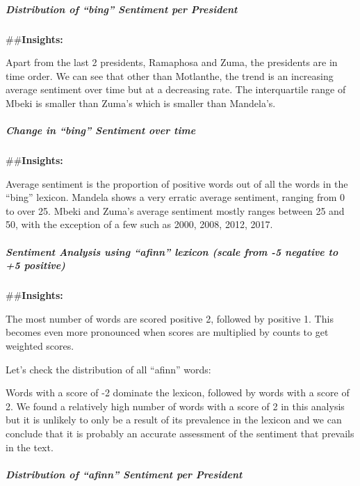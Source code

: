 \documentclass[]{article}
\let\oldsubparagraph\subparagraph
\renewcommand{\subparagraph}[1]{\oldsubparagraph{#1}\mbox{}}
\begin{document}
\hypertarget{distribution-of-bing-sentiment-per-president}{%
\subparagraph{\texorpdfstring{\textbf{Distribution of ``bing'' Sentiment
per
President}}{Distribution of ``bing'' Sentiment per President}}\label{distribution-of-bing-sentiment-per-president}}

\#\#\textbf{Insights:}

Apart from the last 2 presidents, Ramaphosa and Zuma, the presidents are
in time order. We can see that other than Motlanthe, the trend is an
increasing average sentiment over time but at a decreasing rate. The
interquartile range of Mbeki is smaller than Zuma's which is smaller
than Mandela's.

\hypertarget{change-in-bing-sentiment-over-time}{%
\subparagraph{\texorpdfstring{\textbf{Change in ``bing'' Sentiment over
time}}{Change in ``bing'' Sentiment over time}}\label{change-in-bing-sentiment-over-time}}

\#\#\textbf{Insights:}

Average sentiment is the proportion of positive words out of all the
words in the ``bing'' lexicon. Mandela shows a very erratic average
sentiment, ranging from 0 to over 25. Mbeki and Zuma's average sentiment
mostly ranges between 25 and 50, with the exception of a few such as
2000, 2008, 2012, 2017.

\hypertarget{sentiment-analysis-using-afinn-lexicon-scale-from--5-negative-to-5-positive}{%
\subparagraph{\texorpdfstring{\textbf{Sentiment Analysis using ``afinn''
lexicon (scale from -5 negative to +5
positive)}}{Sentiment Analysis using ``afinn'' lexicon (scale from -5 negative to +5 positive)}}\label{sentiment-analysis-using-afinn-lexicon-scale-from--5-negative-to-5-positive}}

\#\#\textbf{Insights:}

The most number of words are scored positive 2, followed by positive 1.
This becomes even more pronounced when scores are multiplied by counts
to get weighted scores.

Let's check the distribution of all ``afinn'' words:

Words with a score of -2 dominate the lexicon, followed by words with a
score of 2. We found a relatively high number of words with a score of 2
in this analysis but it is unlikely to only be a result of its
prevalence in the lexicon and we can conclude that it is probably an
accurate assessment of the sentiment that prevails in the text.

\hypertarget{distribution-of-afinn-sentiment-per-president}{%
\subparagraph{\texorpdfstring{\textbf{Distribution of ``afinn''
Sentiment per
President}}{Distribution of ``afinn'' Sentiment per President}}\label{distribution-of-afinn-sentiment-per-president}}
\end{document}
